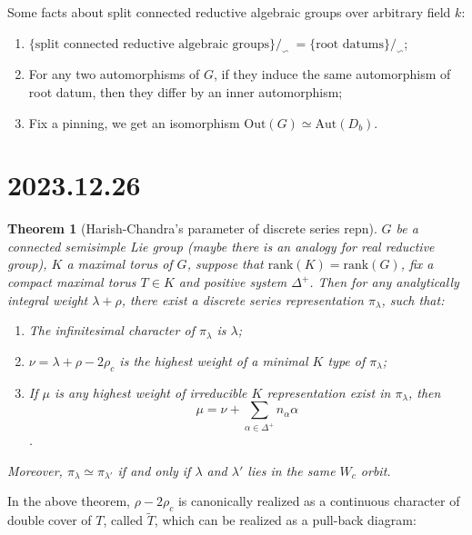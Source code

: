 \documentclass[12pt]{amsart}
\numberwithin{equation}{section}
\newtheorem{thm}{Theorem}[section]
\newcommand{\BC}{{\mathbb {C}}}
\newcommand{\Aut}{{\mathrm{Aut}}}
\newcommand{\Out}{{\mathrm{Out}}}
\renewcommand{\tilde}{\widetilde}
\begin{document}
Some facts about split connected reductive algebraic groups over arbitrary field $k$:
\begin{enumerate}
  \item $\{ \textrm{split connected reductive algebraic groups} \}/_\backsim \ = \{ \textrm{root datums}\} /_\backsim $;
  \item For any two automorphisms of $G$, if they induce the same automorphism of root datum, then they differ by an inner automorphism;
  \item Fix a pinning, we get an isomorphism $\Out(G) \simeq \Aut(D_b)$.
\end{enumerate}


\newpage


\section{2023.12.26}\label{3}

\begin{thm}[Harish-Chandra's parameter of discrete series repn]
  $G$ be a connected semisimple Lie group (maybe there is an analogy for real reductive group), $K$ a maximal torus of $G$, suppose that
  $\mathrm{rank}(K) = \mathrm{rank}(G)$, fix a compact maximal torus $T \in K$ and positive system $\Delta^+$. Then for any analytically integral weight $\lambda + \rho$, there exist a discrete series representation $\pi_{\lambda}$, such that:
  \begin{enumerate}
    \item The infinitesimal character of $\pi_\lambda$ is $\lambda$;
    \item $\nu = \lambda + \rho - 2\rho_c$ is the highest weight of a minimal  $K$ type of $\pi_\lambda$;
    \item If $\mu$ is any highest weight of irreducible $K$ representation exist in $\pi_\lambda$, then $$\mu = \nu + \sum\limits_{\alpha \in \Delta^+} n_{\alpha}\alpha$$.
  \end{enumerate}
  Moreover, $\pi_{\lambda} \simeq \pi_{\lambda'}$ if and only if $\lambda$ and $\lambda'$ lies in the same $W_c$ orbit.
\end{thm}

In the above theorem, $\rho - 2\rho_c$ is canonically realized as a continuous character of double cover of $T$, called $\tilde{T} $, which can be realized as a pull-back diagram:
\end{document}
